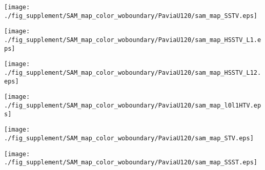 \begin{figure*}[t]
\begin{center}
		\begin{minipage}{0.15\hsize}
			\centerline{\texttt{[image: ./fig\_supplement/SAM\_map\_color\_woboundary/PaviaU120/sam\_map\_SSTV.eps]}} %
		\end{minipage}
		\begin{minipage}{0.15\hsize}
			\centerline{\texttt{[image: ./fig\_supplement/SAM\_map\_color\_woboundary/PaviaU120/sam\_map\_HSSTV\_L1.eps]}} %
		\end{minipage}
		\begin{minipage}{0.15\hsize}
			\centerline{\texttt{[image: ./fig\_supplement/SAM\_map\_color\_woboundary/PaviaU120/sam\_map\_HSSTV\_L12.eps]}} %
		\end{minipage}
		\begin{minipage}{0.15\hsize}
			\centerline{\texttt{[image: ./fig\_supplement/SAM\_map\_color\_woboundary/PaviaU120/sam\_map\_l0l1HTV.eps]}} %
		\end{minipage}
		\begin{minipage}{0.15\hsize}
			\centerline{\texttt{[image: ./fig\_supplement/SAM\_map\_color\_woboundary/PaviaU120/sam\_map\_STV.eps]}} %
		\end{minipage}
		\begin{minipage}{0.15\hsize}
			\centerline{\texttt{[image: ./fig\_supplement/SAM\_map\_color\_woboundary/PaviaU120/sam\_map\_SSST.eps]}} %
		\end{minipage}
		\begin{minipage}{0.050\hsize}
			\centerline{\hspace{\hsize}} %
		\end{minipage}
		
		
		\vspace{1mm}
		

\end{center}
\end{figure*}

